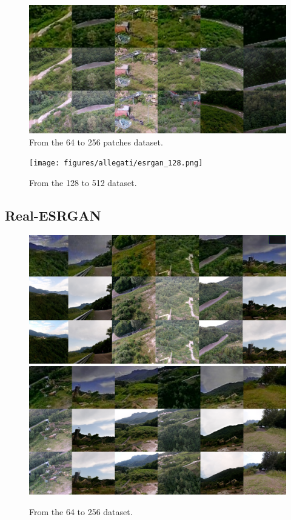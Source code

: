 \begin{figure}[H]
  \centering
  \includegraphics[scale=0.45]{figures/allegati/esrgan_64_patches.png}
  \caption{From the 64 to 256 patches dataset.}
  \label{img:esrgan_att}
\end{figure}

\begin{figure}[H]
  \centering
  \texttt{[image: figures/allegati/esrgan\_128.png]}
  \caption{From the 128 to 512 dataset.}
  \label{img:esrgan_att}
\end{figure}

\subsection{Real-ESRGAN}

\begin{figure}[H]
  \centering
  \includegraphics[scale=0.45]{figures/allegati/realesrgan_64_3.png}
  \includegraphics[scale=0.45]{figures/allegati/realesrgan_64_4.png}
  \caption{From the 64 to 256 dataset.}
  \label{img:realesrgan_att}
\end{figure}

